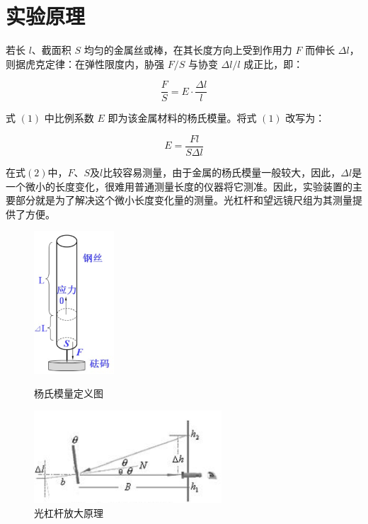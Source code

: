 \documentclass{article}
\begin{document}
\section{实验原理}
若长 \(l\)、截面积 \(S\) 均匀的金属丝或棒，在其长度方向上受到作用力 \(F\) 而伸长 \(\Delta l\)，则据虎克定律：在弹性限度内，胁强 \(F/S\) 与协变 \(\Delta l/l\) 成正比，即：

\begin{equation}
\frac{F}{S}=E\cdot\frac{\Delta l}{l}
\end{equation}

式 \((1)\) 中比例系数 \(E\) 即为该金属材料的杨氏模量。将式 \((1)\) 改写为：

\begin{equation}
E = \frac{Fl}{S\Delta l}
\end{equation}

在式\((2)\)中，\(F\)、\(S\)及\(l\)比较容易测量，由于金属的杨氏模量一般较大，因此，\(\Delta l\)是一个微小的长度变化，很难用普通测量长度的仪器将它测准。因此，实验装置的主要部分就是为了解决这个微小长度变化量的测量。光杠杆和望远镜尺组为其测量提供了方便。

\begin{figure}[ht]
    \centering
    \begin{minipage}{0.45\textwidth} %
        \centering
        \includegraphics[width=3cm]{3.png} %
        \caption{杨氏模量定义图}
    \end{minipage}\hfill
    \begin{minipage}{0.45\textwidth}
        \centering
        \includegraphics[width=7cm]{2.png} %
        \caption{光杠杆放大原理}
    \end{minipage}
\end{figure}
\end{document}
